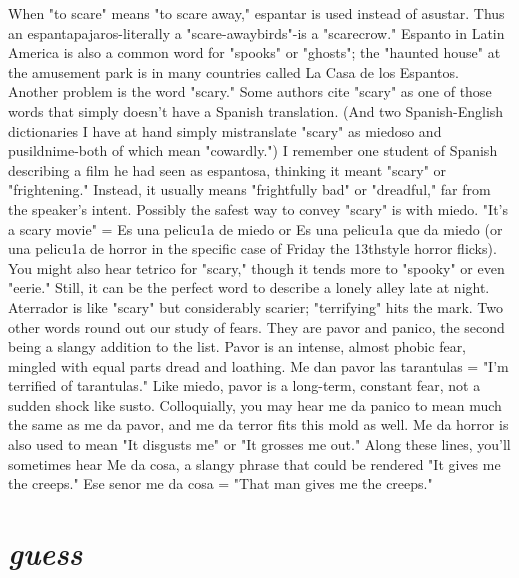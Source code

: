 \documentclass[14pt,a4paper,oneside]{memoir}
\begin{document}
{{{{When "to scare" means "to scare away," espantar is used instead of asustar. Thus an espantapajaros-literally a "scare-awaybirds"-is a "scarecrow." Espanto in Latin America is also a common
word for "spooks" or "ghosts"; the "haunted house" at the amusement
park is in many countries called La Casa de los Espantos.
Another problem is the word "scary." Some authors cite "scary"
as one of those words that simply doesn't have a Spanish translation.
(And two Spanish-English dictionaries I have at hand simply mistranslate "scary" as miedoso and pusildnime-both of which mean "cowardly.") I remember one student of Spanish describing a film he had
seen as espantosa, thinking it meant "scary" or "frightening." Instead,
it usually means "frightfully bad" or "dreadful," far from the speaker's
intent. Possibly the safest way to convey "scary" is with miedo. "It's a
scary movie" = Es una pelicu1a de miedo or Es una pelicu1a que da
miedo (or una pelicu1a de horror in the specific case of Friday the 13thstyle horror flicks). You might also hear tetrico for "scary," though
it tends more to "spooky" or even "eerie." Still, it can be the perfect
word to describe a lonely alley late at night. Aterrador is like "scary"
but considerably scarier; "terrifying" hits the mark.
Two other words round out our study of fears. They are pavor
and panico, the second being a slangy addition to the list. Pavor is an
intense, almost phobic fear, mingled with equal parts dread and loathing. Me dan pavor las tarantulas = "I'm terrified of tarantulas." Like
miedo, pavor is a long-term, constant fear, not a sudden shock like
susto. Colloquially, you may hear me da panico to mean much the
same as me da pavor, and me da terror fits this mold as well. Me da
horror is also used to mean "It disgusts me" or "It grosses me out."
Along these lines, you'll sometimes hear Me da cosa, a slangy phrase
that could be rendered "It gives me the creeps." Ese senor me da cosa
= "That man gives me the creeps."

\section{\emph{guess}}

}}}}
\end{document}
